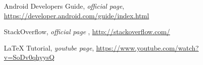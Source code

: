 \begin{thebibliography}{99999}
\singlespace\normalsize

 Android Developers Guide, \textit{ official page}, \url{https://developer.android.com/guide/index.html}

 StackOverflow, \textit{official page }, \url{http://stackoverflow.com/}

 LaTeX Tutorial, \textit{youtube page}, \url{https://www.youtube.com/watch?v=SoDv0qhyysQ}


\end{thebibliography}

